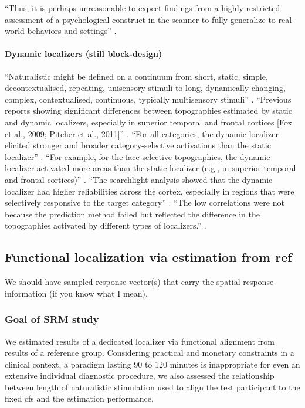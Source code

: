 %
``Thus, it is perhaps unreasonable to expect findings from a highly restricted
assessment of a psychological construct in the scanner to fully generalize to
real-world behaviors and settings'' \citep{bottenhorn2018cooperating}.

\paragraph{Dynamic localizers (still block-design)}

%
``Naturalistic might be defined on a continuum from short, static, simple,
decontextualised, repeating, unisensory stimuli to long, dynamically changing,
complex, contextualised, continuous, typically multisensory stimuli''
\citep{aliko2020naturalistic}.
%
``Previous reports showing significant differences between topographies
estimated by static and dynamic localizers, especially in superior temporal and
frontal cortices [Fox et al., 2009; Pitcher et al., 2011]''
\citep{jiahui2022cross}.
%
``For all categories, the dynamic localizer elicited stronger and broader
category-selective activations than the static localizer''
\citep{jiahui2022cross}.
%
``For example, for the face-selective topographies, the dynamic localizer
activated more areas than the static localizer (e.g., in superior temporal and
frontal cortices)'' \citep{jiahui2022cross}.
%
``The searchlight analysis showed that the dynamic localizer had higher
reliabilities across the cortex, especially in regions that were selectively
responsive to the target category'' \citep{jiahui2022cross}.
%
``The low correlations were not because the prediction method failed but
reflected the difference in the topographies activated by different types of
localizers.'' \citep{jiahui2022cross}.


\subsection{Functional localization via estimation from ref}

%
We should have sampled response vector(s) that carry the spatial response
information (if you know what I mean).


\subsubsection{Goal of SRM study}
We estimated results of a dedicated localizer \citep{sengupta2016extension} via
functional alignment from results of a reference group.
Considering practical and monetary constraints in a clinical context, a paradigm
lasting 90 to 120 minutes is inappropriate for even an extensive individual
diagnostic procedure, we also assessed the relationship between length of
naturalistic stimulation used to align the test participant to the fixed
\ac{cfs} and the estimation performance.



